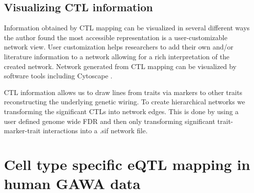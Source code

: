   \subsection{Visualizing CTL information}
  Information obtained by CTL mapping can be visualized in several different ways the author found the most accessible 
  representation is a user-customizable network view. User customization helps researchers to add their own and/or 
  literature information to a network allowing for a rich interpretation of the created network. Network generated from 
  CTL mapping can be visualized by software tools including Cytoscape \cite{Cytoscape:2010, Cytoscape:2003}.

  CTL information allows us to draw lines from traits via markers to other traits reconstructing the underlying genetic 
  wiring. To create hierarchical networks we transforming the significant CTLs into network edges. This is done by 
  using a user defined genome wide FDR and then only transforming significant trait-marker-trait interactions into a 
  .sif network file.

\section{Cell type specific eQTL mapping in human GAWA data}
\label{sec:cellspecificeqtl}

